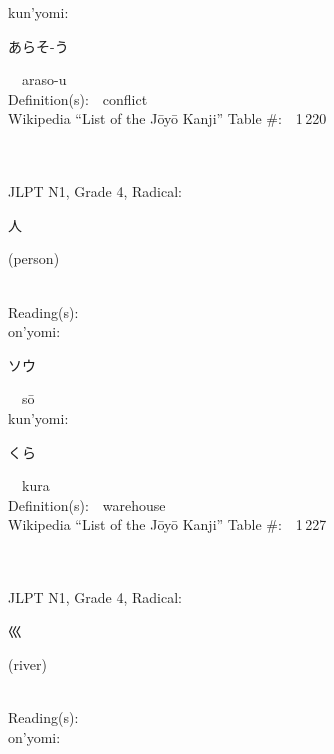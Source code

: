 \begin{multicols}{2}
{\hspace*{1em}}kun'yomi:\ \ \\
{\hspace*{2em}}{\begin{CJK}{UTF8}{min} あらそ-う \end{CJK}}\ \ araso-u\ \ \\
Definition(s):\ \ conflict \\
Wikipedia ``List of the J\=oy\=o Kanji'' Table \#:\ \ 1\,220 \\
\ \ \\
{\fontsize{34pt}{40pt}  }\ \ \\  %
{JLPT N1, Grade 4, Radical:\ \ {\begin{CJK}{UTF8}{min} 人 \end{CJK}} (person) } \\
Reading(s):\ \ \\
{\hspace*{1em}}on'yomi:\ \ \\
{\hspace*{2em}}{\begin{CJK}{UTF8}{min} ソウ \end{CJK}}\ \ s\=o\ \ \\
{\hspace*{1em}}kun'yomi:\ \ \\
{\hspace*{2em}}{\begin{CJK}{UTF8}{min} くら \end{CJK}}\ \ kura\ \ \\
Definition(s):\ \ warehouse \\
Wikipedia ``List of the J\=oy\=o Kanji'' Table \#:\ \ 1\,227 \\
\ \ \\
{\fontsize{34pt}{40pt}  }\ \ \\  %
{JLPT N1, Grade 4, Radical:\ \ {\begin{CJK}{UTF8}{min} 巛 \end{CJK}} (river) } \\
Reading(s):\ \ \\
{\hspace*{1em}}on'yomi:\ \ \\

\end{multicols}
